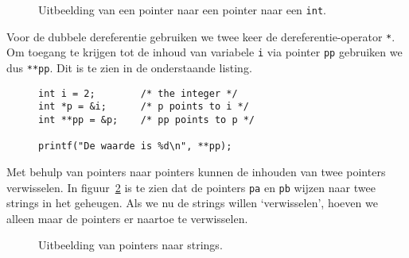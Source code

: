 \begin{figure}[!ht]
\centering
{}
\caption{Uitbeelding van een pointer naar een pointer naar een \texttt{int}.}
\label{fig:poipointertopointer}
\end{figure}

Voor de dubbele dereferentie gebruiken we twee keer de dereferentie-operator \texttt{*}. Om toegang te krijgen tot de inhoud van variabele \texttt{i} via pointer \texttt{pp} gebruiken we dus \texttt{**pp}. Dit is te zien in de onderstaande listing.

\begin{figure}[!ht]
\begin{lstlisting}[caption=Voorbeeld van een pointer naar een pointer.]
int i = 2;        /* the integer */
int *p = &i;      /* p points to i */
int **pp = &p;    /* pp points to p */

printf("De waarde is %d\n", **pp);
\end{lstlisting}
\end{figure}

Met behulp van pointers naar pointers kunnen de inhouden van twee pointers verwisselen. In figuur~\ref{fig:poipointertostring} is te zien dat de pointers \texttt{pa} en \texttt{pb} wijzen naar twee strings in het geheugen. Als we nu de strings willen `verwisselen', hoeven we alleen maar de pointers er naartoe te verwisselen.

\begin{figure}[!ht]
\centering
{}
\caption{Uitbeelding van pointers naar strings.}
\label{fig:poipointertostring}
\end{figure}

